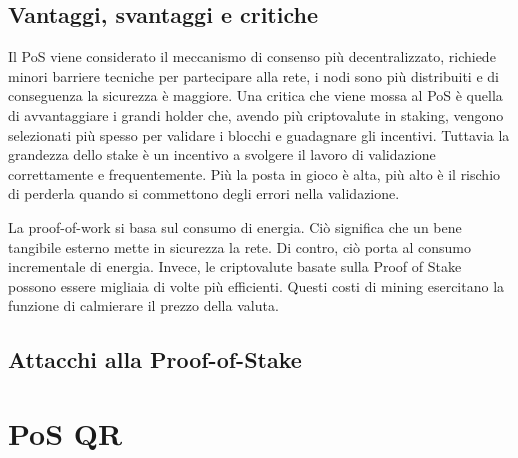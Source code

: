 \subsection{Vantaggi, svantaggi e critiche}
Il PoS viene considerato il meccanismo di consenso più decentralizzato, richiede minori barriere tecniche per partecipare alla rete, i nodi sono più distribuiti e di conseguenza la sicurezza è maggiore. Una critica che viene mossa al PoS è quella di avvantaggiare i grandi holder che, avendo più criptovalute in staking, vengono selezionati più spesso per validare i blocchi e guadagnare gli incentivi. Tuttavia la grandezza dello stake è un incentivo a svolgere il lavoro di validazione correttamente e frequentemente. Più la posta in gioco è alta, più alto è il rischio di perderla quando si commettono degli errori nella validazione.

La proof-of-work si basa sul consumo di energia. Ciò significa che un bene tangibile esterno mette in sicurezza la rete. Di contro, ciò porta al consumo incrementale di energia. Invece, le criptovalute basate sulla Proof of Stake possono essere migliaia di volte più efficienti. Questi costi di mining esercitano la funzione di calmierare il prezzo della valuta.

\subsection{Attacchi alla Proof-of-Stake}

\section{PoS QR}